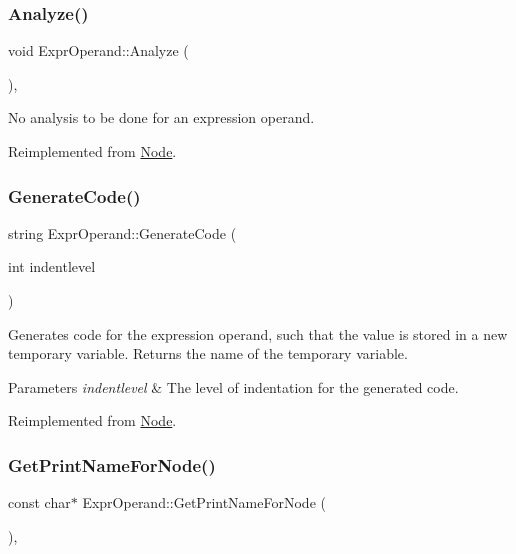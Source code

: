 \subsubsection{\texorpdfstring{Analyze()}{Analyze()}}
{\footnotesize\ttfamily void Expr\+Operand\+::\+Analyze (\begin{DoxyParamCaption}{ }\end{DoxyParamCaption})\hspace{0.3cm}{\ttfamily [inline]}, {\ttfamily [virtual]}}

No analysis to be done for an expression operand. 

Reimplemented from \hyperlink{class_node_a5f88d55c6f253a29def7ccc443d83d47}{Node}.

\mbox{\label{class_expr_operand_afed7d58db66e07a07a8edbb10b9a6f5a}} 
\subsubsection{\texorpdfstring{Generate\+Code()}{GenerateCode()}}
{\footnotesize\ttfamily string Expr\+Operand\+::\+Generate\+Code (\begin{DoxyParamCaption}\item[{int}]{indentlevel }\end{DoxyParamCaption})\hspace{0.3cm}{\ttfamily [virtual]}}

Generates code for the expression operand, such that the value is stored in a new temporary variable. Returns the name of the temporary variable. 
\begin{DoxyParams}{Parameters}
{\em indentlevel} & The level of indentation for the generated code. \\
\hline
\end{DoxyParams}


Reimplemented from \hyperlink{class_node_acb60e526730e8436056375a3055c2c32}{Node}.

\mbox{\label{class_expr_operand_a51b24b2cbb8ff22213783bde2a96642c}} 
\subsubsection{\texorpdfstring{Get\+Print\+Name\+For\+Node()}{GetPrintNameForNode()}}
{\footnotesize\ttfamily const char$\ast$ Expr\+Operand\+::\+Get\+Print\+Name\+For\+Node (\begin{DoxyParamCaption}{ }\end{DoxyParamCaption})\hspace{0.3cm}{\ttfamily [inline]}, {\ttfamily [virtual]}}

